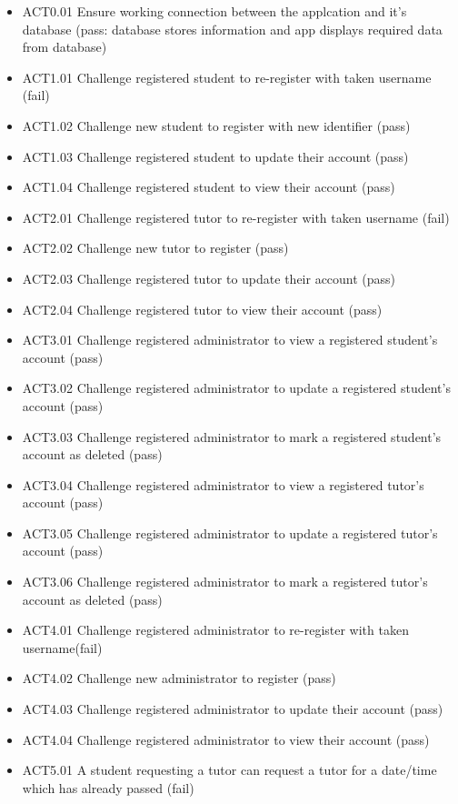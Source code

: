 \documentclass[12pt]{article}
\begin{document}
\begin{itemize}
\item ACT0.01	Ensure working connection between the applcation and it's database (pass: database stores information and app displays required data from database)
\item ACT1.01	Challenge registered student to re-register with taken username (fail)
\item ACT1.02	Challenge new student to register with new identifier (pass)
\item ACT1.03	Challenge registered student to update their account (pass)
\item ACT1.04	Challenge registered student to view their account (pass)
\item ACT2.01	Challenge registered tutor to re-register with taken username (fail)
\item ACT2.02	Challenge new tutor to register (pass)
\item ACT2.03	Challenge registered tutor to update their account (pass)
\item ACT2.04	Challenge registered tutor to view their account (pass)
\item ACT3.01	Challenge registered administrator to view a registered student's account (pass)
\item ACT3.02	Challenge registered administrator to update a registered student's account (pass)
\item ACT3.03	Challenge registered administrator to mark a registered student's account as deleted (pass)
\item ACT3.04	Challenge registered administrator to view a registered tutor's account (pass)
\item ACT3.05	Challenge registered administrator to update a registered tutor's account (pass)
\item ACT3.06	Challenge registered administrator to mark a registered tutor's account as deleted (pass)
\item ACT4.01	Challenge registered administrator to re-register with taken username(fail)
\item ACT4.02	Challenge new administrator to register (pass)
\item ACT4.03	Challenge registered administrator to update their account (pass)
\item ACT4.04	Challenge registered administrator to view their account (pass)
\item ACT5.01	A student requesting a tutor can request a tutor for a date/time which has already passed  (fail)

\end{itemize}
\end{document}
